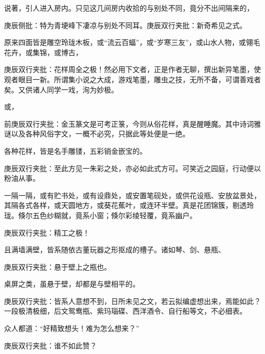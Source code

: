 \begin{parag}


    说著，引人进入房内。只见这几间房内收拾的与别处不同，竟分不出间隔来的，\begin{note}庚辰侧批：特为青埂峰下凄凉与别处不同耳。庚辰双行夹批：新奇希见之式。\end{note}原来四面皆是雕空玲珑木板，或“流云百蝠”，或“岁寒三友”，或山水人物，或翎毛花卉，或集锦，或博古，\begin{note}庚辰双行夹批：花样周全之极！然必用下文者，正是作者无聊，撰出新异笔墨，使观者眼目一新。所谓集小说之大成，游戏笔墨，雕虫之技，无所不备，可谓善戏者矣。又供诸人同学一戏，洵为妙极。\end{note}或，\begin{note}前庚辰双行夹批：金玉篆文是可考正箓，今则从俗花样，真是醒睡魔。其中诗词雅谜以及各种风俗字文，一概不必究，只据此等处便是一绝。\end{note}各种花样，皆是名手雕镂，五彩销金嵌宝的。\begin{note}庚辰双行夹批：至此方见一朱彩之处，亦必如此式方可。可笑近之园庭，行动便以粉油从事。\end{note}一隔一隔，或有贮书处，或有设鼎处，或安置笔砚处，或供花设瓶、安放盆景处，其隔各式各样，或天圆地方，或葵花蕉叶，或连环半壁。真是花团锦簇，剔透玲珑。倏尔五色纱糊就，竟系小窗；倏尔彩绫轻覆，竟系幽户。\begin{note}庚辰双行夹批：精工之极！\end{note}且满墙满壁，皆系随依古董玩器之形抠成的槽子。诸如琴、剑、悬瓶、\begin{note}庚辰双行夹批：悬于壁上之瓶也。\end{note}桌屏之类，虽悬于壁，却都是与壁相平的。\begin{note}庚辰双行夹批：皆系人意想不到，日所未见之文，若云拟编虚想出来，焉能如此？一段极清极细，后文鸳鸯瓶、紫玛瑙碟、西洋酒令、自行船等文，不必细表。\end{note}众人都道：“好精致想头！难为怎么想来？”\begin{note}庚辰双行夹批：谁不如此赞？\end{note}
\end{parag}


